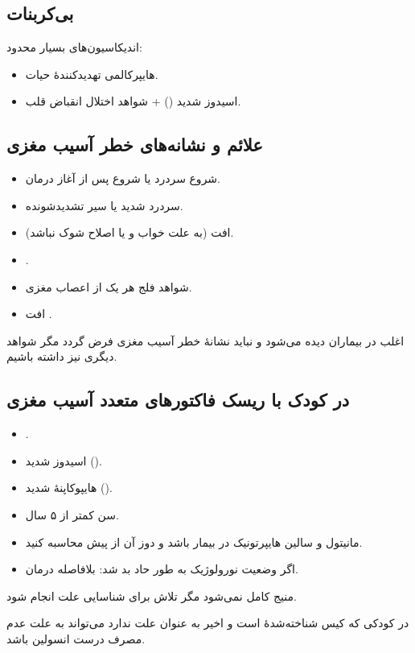 \documentclass[12pt,a4paper]{article}
\begin{document}
\subsection*{بی‌کربنات}
اندیکاسیون‌های بسیار محدود:
\begin{itemize}
\item هایپرکالمی تهدیدکنندهٔ حیات.
\item اسیدوز شدید () + شواهد اختلال انقباض قلب.
\end{itemize}
\subsection*{علائم و نشانه‌های خطر آسیب مغزی}
\begin{itemize}
\item شروع سردرد یا شروع پس از آغاز درمان.
\item سردرد شدید یا سیر تشدیدشونده.
\item افت  (به علت خواب و یا اصلاح شوک نباشد).
\item {}.
\item شواهد فلج هر یک از اعصاب مغزی.
\item افت .
\end{itemize}

 اغلب در بیماران  دیده می‌شود و نباید نشانهٔ خطر آسیب مغزی فرض گردد مگر شواهد دیگری نیز داشته باشیم.
\subsection*{در کودک با ریسک فاکتورهای متعدد آسیب مغزی}
\begin{itemize}
\item {}.
\item اسیدوز شدید ().
\item هایپوکاپنهٔ شدید ().
\item سن کمتر از ۵ سال.
\item مانیتول و سالین هایپرتونیک در  بیمار باشد و دوز آن از پیش محاسبه کنید.
\item اگر وضعیت نورولوژیک به طور حاد بد شد: بلافاصله درمان.
\end{itemize}
منیج  کامل نمی‌شود مگر تلاش برای شناسایی علت  انجام شود.

 در کودکی که کیس شناخته‌شدهٔ  است و  اخیر به عنوان علت  ندارد می‌تواند به علت عدم مصرف درست انسولین باشد.
\end{document}
